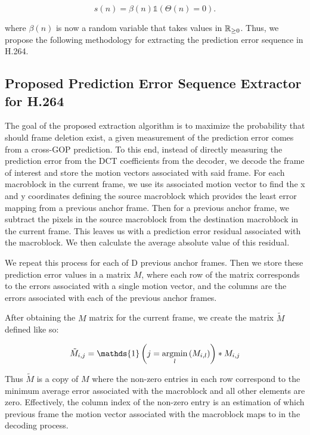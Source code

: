 \begin{equation}
s(n) = \beta(n) \mathds{1} \left( \Theta(n) = 0 \right).
\end{equation}

where $\beta(n)$ is now a random variable that takes values in $\operatorname*{\mathbb{R}}_{\geq 0}$. Thus, we propose the following methodology for extracting the prediction error sequence in H.264.

\subsection{Proposed Prediction Error Sequence Extractor for H.264}

The goal of the proposed extraction algorithm is to maximize the probability that should frame deletion exist, a given measurement of the prediction error comes from a cross-GOP prediction. To this end, instead of directly measuring the prediction error from the DCT coefficients from the decoder, we decode the frame of interest and store the motion vectors associated with said frame. For each macroblock in the current frame, we use its associated motion vector to find the x and y coordinates defining the source macroblock which provides the least error mapping from a previous anchor frame. Then for a previous anchor frame, we subtract the pixels in the source macroblock from the destination macroblock in the current frame. This leaves us with a prediction error residual associated with the macroblock. We then calculate the average absolute value of this residual.


We repeat this process for each of D previous anchor frames. Then we store these prediction error values in a matrix $M$, where each row of the matrix corresponds to the errors associated with a single motion vector, and the columns are the errors associated with each of the previous anchor frames.

After obtaining the $M$ matrix for the current frame, we create the matrix $\tilde{M}$ defined like so:

\begin{equation}
  \tilde{M}_{i, j} = \mathds{1} \left(j = \argmin_{l} \left( M_{i, l} \right) \right) * M_{i, j}
\end{equation}

Thus $\tilde{M}$ is a copy of $M$ where the non-zero entries in each row correspond to the minimum average error associated with the macroblock and all other elements are zero. Effectively, the column index of the non-zero entry is an estimation of which previous frame the motion vector associated with the macroblock maps to in the decoding process.

